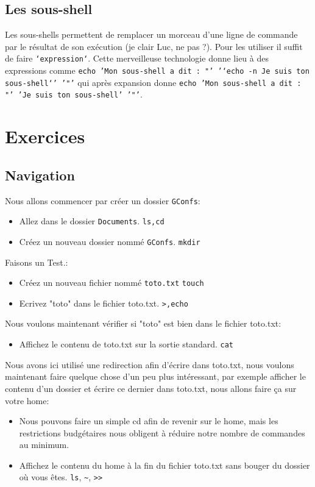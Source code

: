 \documentclass{article}
\begin{document}
\subsection{Les sous-shell}

Les sous-shells permettent de remplacer un morceau d'une ligne de commande par le résultat de son exécution (je clair Luc, ne pas ?).
Pour les utiliser il suffit de faire \texttt{`expression`}.
Cette merveilleuse technologie donne lieu à des expressions comme \texttt{echo 'Mon sous-shell a dit : "' '`echo -n Je suis ton sous-shell`' '"'} qui après expansion donne \texttt{echo 'Mon sous-shell a dit : "' 'Je suis ton sous-shell' '"'}.

\section{Exercices}

\subsection{Navigation}

Nous allons commencer par créer un dossier \texttt{GConfs}:
\begin{itemize}
\item Allez dans le dossier \texttt{Documents}. \hfill \texttt{ls,cd}
\item Créez un nouveau dossier nommé \texttt{GConfs}. \hfill \texttt{mkdir}
\end{itemize}\vspace{1em}

Faisons un Test.:
\begin{itemize}
\item Créez un nouveau fichier nommé \texttt{toto.txt} \hfill \texttt{touch}
\item Ecrivez "toto" dans le fichier toto.txt. \hfill \texttt{>,echo}
\end{itemize}\vspace{1em}

Nous voulons maintenant vérifier si "toto" est bien dans le fichier toto.txt:
\begin{itemize}
\item Affichez le contenu de toto.txt sur la sortie standard. \hfill \texttt{cat}
\end{itemize}\vspace{1em}

Nous avons ici utilisé une redirection afin d'écrire dans toto.txt, nous voulons maintenant faire quelque chose d'un peu plus intéressant, par exemple afficher le contenu d'un dossier et écrire ce dernier dans toto.txt, nous allons faire ça sur votre home:
\begin{itemize}
\item Nous pouvons faire un simple cd afin de revenir sur le home, mais les restrictions budgétaires nous obligent à réduire notre nombre de commandes au minimum.
\item Affichez le contenu du home à la fin du fichier toto.txt sans bouger du dossier où vous êtes. \hfill \texttt{ls}, \texttt{\~}, \texttt{>>}
\end{itemize}\vspace{1em}
\end{document}
